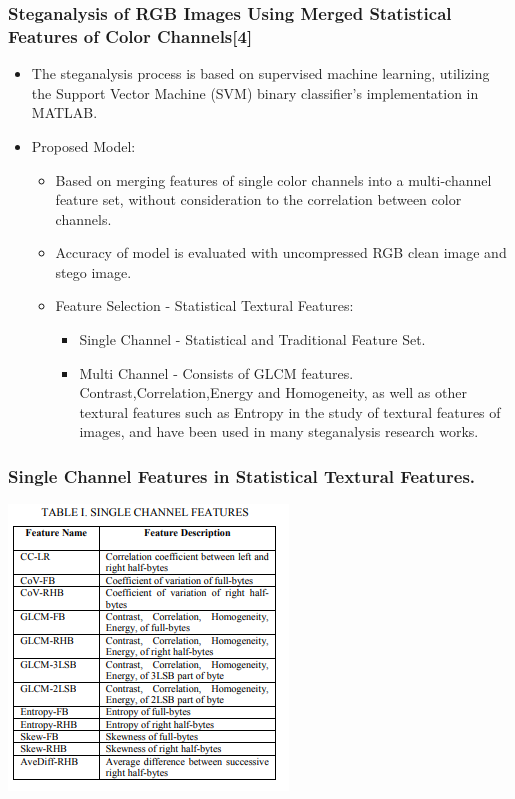 \documentclass{beamer} %
\theoremstyle{definition} %
\begin{document}
\begin{frame}
\frametitle{Steganalysis of RGB Images Using Merged Statistical Features of Color Channels[4]  }
\begin{itemize}
	\item The steganalysis process is based on supervised machine learning, utilizing the Support Vector Machine (SVM) binary classifier’s implementation in MATLAB. 
	\item Proposed Model:
	\begin{itemize}
        \item{Based on merging features of single color channels into a multi-channel feature set, without consideration to the correlation between color channels.}
        \item{Accuracy of model is evaluated with uncompressed RGB clean image and stego image.}
     \item Feature Selection - Statistical Textural Features:
     \begin{itemize}
     	\item Single Channel - Statistical and Traditional Feature Set. 
     	\item Multi Channel -  Consists of GLCM features. Contrast,Correlation,Energy and Homogeneity, as well as other textural features such as Entropy in the study of textural features of images, and have been used in many steganalysis research works.
     \end{itemize}
	\end{itemize}
\end{itemize}
\end{frame}

\begin{frame}
\frametitle{Single Channel Features in Statistical Textural Features.  }
\includegraphics[scale=1.0]{singleChannelFeatures.png}
\end{frame}
\end{document}
